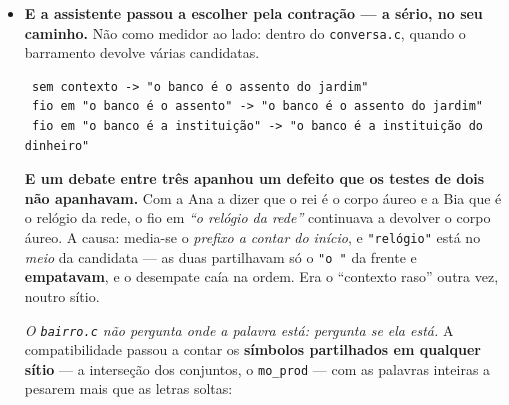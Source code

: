 \documentclass[11pt]{article}
\newcommand{\code}[1]{\texttt{\small #1}}
\theoremstyle{plain}
\theoremstyle{remark}
\begin{document}
\begin{itemize}
\textbf{Um conjunto de medida zero, somado consigo, dá um intervalo inteiro.} O pó não enche; a
\emph{soma} enche. E era exatamente o que faltava --- a versão anterior tinha medido o conjunto e concluído sobre
a operação, que é meia estrutura outra vez.

\textbf{E o produto fecha}: a Julia de $z^2$ é o círculo unitário, invariante nos $360$ pontos, e
fronteira a sério --- dentro cai para $0$, fora foge. Multiplicar no círculo é \emph{rodar}, e
rodar é o elíptico, que é o rei. \emph{O que a soma abre em área, o produto fecha em círculo.}

\textbf{E o operador no centro muda o passo, não o mecanismo}: o denominador do círculo cresce
$55$, o da PA $137\,861$, o da PG $766\,886\,005$. O termo grande é a abertura --- o rei não tem
nenhum (só uns) e por isso é o mais fechado.

Um erro de leitura que o teste apanhou: media-se a invariância do círculo \emph{iterando} $z^2$ quarenta
vezes, e isso mede a deriva do \code{double}, não a matemática --- se $|z| = 1+\varepsilon$, ao fim
de $40$ passos é $(1+\varepsilon)^{2^{40}}$. A afirmação verdadeira é $|z^2| = |z|^2$, e mede-se
\emph{num passo}.

\item \textbf{E a assistente passou a escolher pela contração --- a sério, no seu caminho.} Não
como medidor ao lado: dentro do \code{conversa.c}, quando o barramento devolve várias candidatas.

\begin{verbatim}
 sem contexto -> "o banco é o assento do jardim"
 fio em "o banco é o assento" -> "o banco é o assento do jardim"
 fio em "o banco é a instituição" -> "o banco é a instituição do dinheiro"
\end{verbatim}

\textbf{E um debate entre três apanhou um defeito que os testes de dois não apanhavam.} Com a
Ana a dizer que o rei é o corpo áureo e a Bia que é o relógio da rede, o fio em \emph{``o relógio
da rede''} continuava a devolver o corpo áureo. A causa: media-se o \emph{prefixo a contar do
início}, e \code{"relógio"} está no \emph{meio} da candidata --- as duas partilhavam só o
\code{"o "} da frente e \textbf{empatavam}, e o desempate caía na ordem. Era o ``contexto raso''
outra vez, noutro sítio.

\emph{O \code{bairro.c} não pergunta onde a palavra está: pergunta se ela está.} A compatibilidade
passou a contar os \textbf{símbolos partilhados em qualquer sítio} --- a interseção dos conjuntos,
o \code{mo\_prod} --- com as palavras inteiras a pesarem mais que as letras soltas:


\end{itemize}
\end{document}
